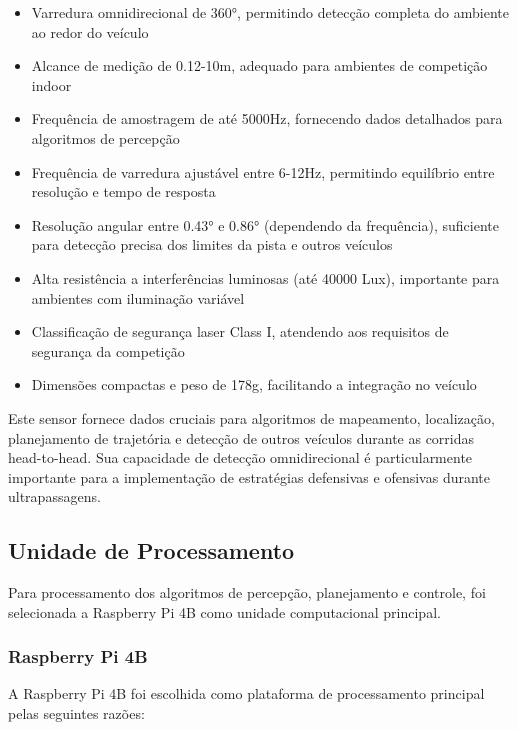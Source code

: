 \begin{itemize}
      \item Varredura omnidirecional de 360°, permitindo detecção completa do ambiente ao
            redor do veículo
      \item Alcance de medição de 0.12-10m, adequado para ambientes de competição indoor
      \item Frequência de amostragem de até 5000Hz, fornecendo dados detalhados para
            algoritmos de percepção
      \item Frequência de varredura ajustável entre 6-12Hz, permitindo equilíbrio entre
            resolução e tempo de resposta
      \item Resolução angular entre 0.43° e 0.86° (dependendo da frequência), suficiente
            para detecção precisa dos limites da pista e outros veículos
      \item Alta resistência a interferências luminosas (até 40000 Lux), importante para
            ambientes com iluminação variável
      \item Classificação de segurança laser Class I, atendendo aos requisitos de segurança
            da competição
      \item Dimensões compactas e peso de 178g, facilitando a integração no veículo
\end{itemize}

Este sensor fornece dados cruciais para algoritmos de mapeamento, localização,
planejamento de trajetória e detecção de outros veículos durante as corridas
head-to-head. Sua capacidade de detecção omnidirecional é particularmente
importante para a implementação de estratégias defensivas e ofensivas durante
ultrapassagens.

\subsection{Unidade de Processamento}

Para processamento dos algoritmos de percepção, planejamento e controle, foi
selecionada a Raspberry Pi 4B como unidade computacional principal.

\subsubsection{Raspberry Pi 4B}

A Raspberry Pi 4B foi escolhida como plataforma de processamento principal
pelas seguintes razões:

